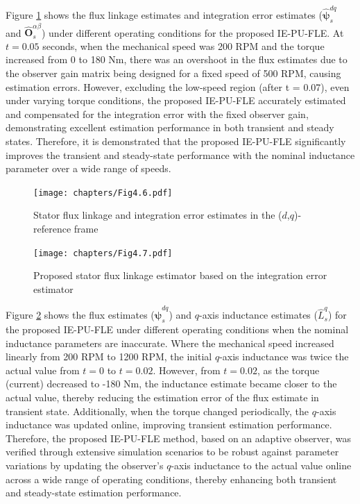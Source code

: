 Figure \ref{Fig:4.6} shows the flux linkage estimates and integration error estimates ($\hat{\boldsymbol{\psi}}^{dq}_s$ and $\hat{\mathbf{O}}^{\alpha\beta}_s$) under different operating conditions for the proposed IE-PU-FLE. At $t=0.05$ seconds, when the mechanical speed was 200 RPM and the torque increased from 0 to 180 Nm, there was an overshoot in the flux estimates due to the observer gain matrix being designed for a fixed speed of 500 RPM, causing estimation errors. However, excluding the low-speed region (after t = 0.07), even under varying torque conditions, the proposed IE-PU-FLE accurately estimated and compensated for the integration error with the fixed observer gain, demonstrating excellent estimation performance in both transient and steady states. Therefore, it is demonstrated that the proposed IE-PU-FLE significantly improves the transient and steady-state performance with the nominal inductance parameter over a wide range of speeds.

\begin{figure}[H]
    \centering
    \texttt{[image: chapters/Fig4.6.pdf]}
    \caption{Stator flux linkage and integration error estimates in the ($d$,$q$)-reference frame}
    \label{Fig:4.6}
\end{figure}
\newpage
\begin{figure}[H]
    \centering
    \texttt{[image: chapters/Fig4.7.pdf]}
    \caption{Proposed stator flux linkage estimator based on the integration error estimator}
    \label{Fig:4.7}
\end{figure}

Figure \ref{Fig:4.7} shows the flux estimates ($\hat{\boldsymbol{\psi}}^{dq}_s$) and $q$-axis inductance estimates ($\hat{L}^{q}_s$) for the proposed IE-PU-FLE under different operating conditions when the nominal inductance parameters are inaccurate. Where the mechanical speed increased linearly from 200 RPM to 1200 RPM, the initial $q$-axis inductance was twice the actual value from $t=0$ to $t=0.02$. However, from $t=0.02$, as the torque (current) decreased to -180 Nm, the inductance estimate became closer to the actual value, thereby reducing the estimation error of the flux estimate in transient state. Additionally, when the torque changed periodically, the $q$-axis inductance was updated online, improving transient estimation performance. Therefore, the proposed IE-PU-FLE method, based on an adaptive observer, was verified through extensive simulation scenarios to be robust against parameter variations by updating the observer's $q$-axis inductance to the actual value online across a wide range of operating conditions, thereby enhancing both transient and steady-state estimation performance.

